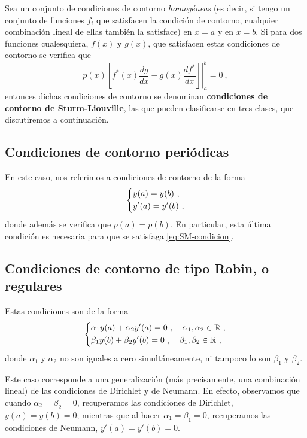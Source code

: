 Sea un conjunto de condiciones de contorno \emph{homogéneas} (es decir, si tengo un conjunto de funciones $f_i$ que satisfacen la condición de contorno, cualquier combinación lineal de ellas también la satisface) en $x=a$ y en $x=b$. Si para dos funciones cualesquiera, $f(x)$ y $g(x)$, que satisfacen estas condiciones de contorno se verifica que
\begin{equation} \label{eq:SM-condicion}
    p(x)  \left.  \left[ f^\ast(x) \frac{dg}{dx} - g(x)\frac{df^\ast}{dx} \right]\right|_a^b = 0 \ ,
\end{equation}
entonces dichas condiciones de contorno se denominan \textbf{condiciones de contorno de Sturm-Liouville}, las que pueden clasificarse en tres clases, que discutiremos a continuación.

\subsection{Condiciones de contorno periódicas}

En este caso, nos referimos a condiciones de contorno de la forma
\begin{equation}
    \begin{dcases}
        y(a) = y(b) \ , \\
        y'(a) = y'(b) \ ,
    \end{dcases}
\end{equation}
donde además se verifica que $p(a) = p(b)$. En particular, esta última condición es necesaria para que se satisfaga \eqref{eq:SM-condicion}.

\subsection{Condiciones de contorno de tipo Robin, o regulares}

Estas condiciones son de la forma
\begin{equation}
    \begin{dcases}
        \alpha_1 y(a) + \alpha_2 y'(a) = 0 \ , \quad \alpha_1, \alpha_2 \in \mathbb{R} \ , \\
        \beta_1 y(b) + \beta_2 y'(b) = 0 \ , \quad \beta_1, \beta_2 \in \mathbb{R} \ , 
    \end{dcases}
\end{equation}
donde $\alpha_1$ y $\alpha_2$ no son iguales a cero simultáneamente, ni tampoco lo son $\beta_1$ y $\beta_2$.

Este caso corresponde a una generalización (más precisamente, una combinación lineal) de las condiciones de Dirichlet y de Neumann. En efecto, observamos que cuando $\alpha_2 = \beta_2 = 0$, recuperamos las condiciones de Dirichlet, $y(a) = y(b) = 0$; mientras que al hacer $\alpha_1 = \beta_1 = 0$, recuperamos las condiciones de Neumann, $y'(a) = y'(b) = 0$.


